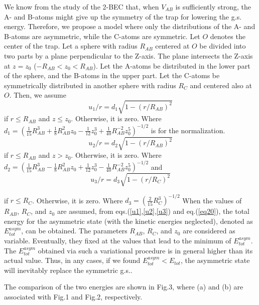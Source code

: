\documentclass[single-column,showpacs,groupedaddress]{revtex4}
\begin{document}
We know from the study of the 2-BEC \cite{esry97,chui99,tripp00} that, when $%
V_{AB}$ is sufficiently strong, the A- and B-atoms might give up the
symmetry of the trap for lowering the g.s. energy. Therefore, we propose a
model where only the distributions of the A- and B-atoms are asymmetric,
while the C-atoms are symmetric. Let $O$ denotes the center of the trap. Let
a sphere with radius $R_{AB}$ centered at $O$ be divided into two parts by a
plane perpendicular to the Z-axis. The plane intersects the Z-axis at $%
z=z_{0}$ ($-R_{AB}<z_{0}<R_{AB}$). Let the A-atoms be distributed in the
lower part of the sphere, and the B-atoms in the upper part. Let the C-atoms
be symmetrically distributed in another sphere with radius $R_{C}$ and
centered also at $O$. Then, we assume
\begin{equation}
u_{1}/r=d_{1}\sqrt{1-(r/R_{AB})^{2}}  \label{u1}
\end{equation}%
if $r\leq R_{AB}$ and $z\leq z_{0}$. Otherwise, it is zero. Where $d_{1}=(%
\frac{1}{15}R_{AB}^{3}+\frac{1}{8}R_{AB}^{2}z_{0}-\frac{1}{12}z_{0}^{3}+%
\frac{1}{40}R_{AB}^{-2}z_{0}^{5})^{-1/2}$ is for the normalization.
\begin{equation}
u_{2}/r=d_{2}\sqrt{1-(r/R_{AB})^{2}}  \label{u2}
\end{equation}%
if $r\leq R_{AB}$ and $z>z_{0}$. Otherwise, it is zero. Where $d_{2}=(\frac{1%
}{15}R_{AB}^{3}-\frac{1}{8}R_{AB}^{2}z_{0}+\frac{1}{12}z_{0}^{3}-\frac{1}{40}%
R_{AB}^{-2}z_{0}^{5})^{-1/2}$ and
\begin{equation}
u_{3}/r=d_{3}\sqrt{1-(r/R_{C})^{2}}  \label{u3}
\end{equation}

if $r\leq R_{C}$. Otherwise, it is zero. Where $d_{3}=(\frac{2}{15}%
R_{C}^{3})^{-1/2}$ When the values of $R_{AB}$, $R_{C}$, and $z_{0}$ are
assumed, from eqs.(\ref{u1},\ref{u2},\ref{u3}) and eq.(\ref{eq20}), the
total energy for the asymmetric state (with the kinetic energies neglected),
denoted as $E_{tot}^{asym}$, can be obtained. The parameters $R_{AB}$, $R_{C}
$, and $z_{0}$ are considered as variable. Eventually, they fixed at the
values that lead to the minimum of $E_{tot}^{asym}$. The $E_{tot}^{asym}$
obtained via such a variational procedure is in general higher than its
actual value. Thus, in any cases, if we found $E_{tot}^{asym}<E_{tot}$, the
asymmetric state will inevitably replace the symmetric g.s..

The comparison of the two energies are shown in Fig.3, where (a) and (b) are
associated with Fig.1 and Fig.2, respectively.
\end{document}
